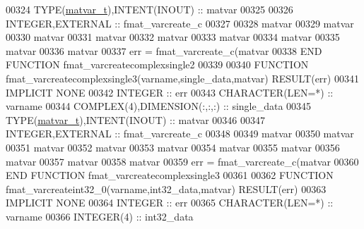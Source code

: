 \begin{DoxyCode}
00324     \textcolor{keywordtype}{TYPE}(\hyperlink{group___m_a_t_structmatvar__t}{matvar\_t}),\textcolor{keywordtype}{INTENT(INOUT)}    :: matvar
00325 
00326     \textcolor{keywordtype}{INTEGER},\textcolor{keywordtype}{EXTERNAL}                :: fmat\_varcreate\_c
00327 
00328     matvar%
00329     matvar%
00330     matvar%
00331     matvar%
00332     matvar%
00333     matvar%
00334     matvar%
00335     matvar%
00336     matvar%
00337     err = fmat\_varcreate\_c(matvar%
00338 \textcolor{keyword}{END FUNCTION }fmat\_varcreatecomplexsingle2
00339 
00340 \textcolor{keyword}{FUNCTION }fmat\_varcreatecomplexsingle3(varname,single\_data,matvar) \textcolor{keyword}{RESULT}(err)
00341 \textcolor{keywordtype}{IMPLICIT NONE}
00342     \textcolor{keywordtype}{INTEGER}                         :: err
00343     \textcolor{keywordtype}{CHARACTER(LEN=*)}                :: varname
00344     \textcolor{keywordtype}{COMPLEX(4)},\textcolor{keywordtype}{DIMENSION(:,:,:)}     :: single\_data
00345     \textcolor{keywordtype}{TYPE}(\hyperlink{group___m_a_t_structmatvar__t}{matvar\_t}),\textcolor{keywordtype}{INTENT(INOUT)}    :: matvar
00346 
00347     \textcolor{keywordtype}{INTEGER},\textcolor{keywordtype}{EXTERNAL}                :: fmat\_varcreate\_c
00348 
00349     matvar%
00350     matvar%
00351     matvar%
00352     matvar%
00353     matvar%
00354     matvar%
00355     matvar%
00356     matvar%
00357     matvar%
00358     matvar%
00359     err = fmat\_varcreate\_c(matvar%
00360 \textcolor{keyword}{END FUNCTION }fmat\_varcreatecomplexsingle3
00361 
00362 \textcolor{keyword}{FUNCTION }fmat\_varcreateint32\_0(varname,int32\_data,matvar) \textcolor{keyword}{RESULT}(err)
00363 \textcolor{keywordtype}{IMPLICIT NONE}
00364     \textcolor{keywordtype}{INTEGER}                         :: err
00365     \textcolor{keywordtype}{CHARACTER(LEN=*)}                :: varname
00366     \textcolor{keywordtype}{INTEGER(4)}                      :: int32\_data

\end{DoxyCode}
